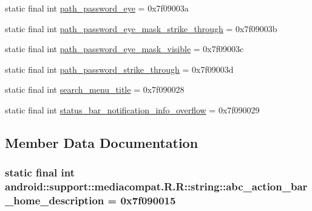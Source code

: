 \begin{CompactItemize}
static final int \hyperlink{classandroid_1_1support_1_1mediacompat_1_1_r_1_1string_6af8ba25839d6295b9299e193a396c58}{path\_\-password\_\-eye} = 0x7f09003a
\item 
static final int \hyperlink{classandroid_1_1support_1_1mediacompat_1_1_r_1_1string_9b1c863a34a5d9419fb175569bc591e4}{path\_\-password\_\-eye\_\-mask\_\-strike\_\-through} = 0x7f09003b
\item 
static final int \hyperlink{classandroid_1_1support_1_1mediacompat_1_1_r_1_1string_5466c26b40a75a31bbdebac197e1cea6}{path\_\-password\_\-eye\_\-mask\_\-visible} = 0x7f09003c
\item 
static final int \hyperlink{classandroid_1_1support_1_1mediacompat_1_1_r_1_1string_c5d4d4650fa1da6af346ef8bbe49505d}{path\_\-password\_\-strike\_\-through} = 0x7f09003d
\item 
static final int \hyperlink{classandroid_1_1support_1_1mediacompat_1_1_r_1_1string_544fe9cec0ef73cbd9e95e766298d546}{search\_\-menu\_\-title} = 0x7f090028
\item 
static final int \hyperlink{classandroid_1_1support_1_1mediacompat_1_1_r_1_1string_9044fc378e6fa1f48c81d68870bd5b87}{status\_\-bar\_\-notification\_\-info\_\-overflow} = 0x7f090029
\end{CompactItemize}


\subsection{Member Data Documentation}
\hypertarget{classandroid_1_1support_1_1mediacompat_1_1_r_1_1string_45227507492b75c08ad899b30bbfa873}{
\subsubsection[{abc\_\-action\_\-bar\_\-home\_\-description}]{\setlength{\rightskip}{0pt plus 5cm}static final int android::support::mediacompat.R.R::string::abc\_\-action\_\-bar\_\-home\_\-description = 0x7f090015}}
\label{classandroid_1_1support_1_1mediacompat_1_1_r_1_1string_45227507492b75c08ad899b30bbfa873}


